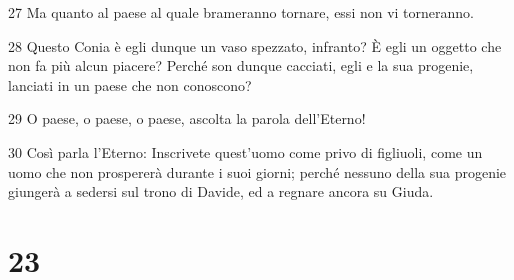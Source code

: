 \par 27 Ma quanto al paese al quale brameranno tornare, essi non vi torneranno.
\par 28 Questo Conia è egli dunque un vaso spezzato, infranto? È egli un oggetto che non fa più alcun piacere? Perché son dunque cacciati, egli e la sua progenie, lanciati in un paese che non conoscono?
\par 29 O paese, o paese, o paese, ascolta la parola dell'Eterno!
\par 30 Così parla l'Eterno: Inscrivete quest'uomo come privo di figliuoli, come un uomo che non prospererà durante i suoi giorni; perché nessuno della sua progenie giungerà a sedersi sul trono di Davide, ed a regnare ancora su Giuda.

\chapter{23}

